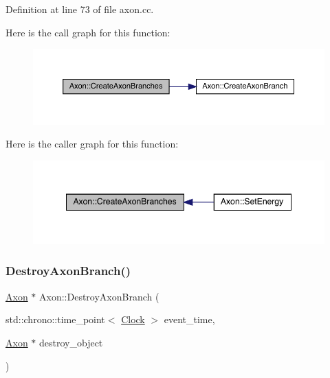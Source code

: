 Definition at line 73 of file axon.\+cc.

Here is the call graph for this function\+:
\nopagebreak
\begin{figure}[H]
\begin{center}
\leavevmode
\includegraphics[width=350pt]{class_axon_ab0da51c05a0879efdb45c594b68ef8fd_cgraph}
\end{center}
\end{figure}
Here is the caller graph for this function\+:
\nopagebreak
\begin{figure}[H]
\begin{center}
\leavevmode
\includegraphics[width=348pt]{class_axon_ab0da51c05a0879efdb45c594b68ef8fd_icgraph}
\end{center}
\end{figure}
\mbox{\label{class_axon_a6ac580e4565d24c955b0a48d7a8b20e2}} 
\subsubsection{\texorpdfstring{Destroy\+Axon\+Branch()}{DestroyAxonBranch()}}
{\footnotesize\ttfamily \hyperlink{class_axon}{Axon} $\ast$ Axon\+::\+Destroy\+Axon\+Branch (\begin{DoxyParamCaption}\item[{std\+::chrono\+::time\+\_\+point$<$ \hyperlink{universe_8h_a0ef8d951d1ca5ab3cfaf7ab4c7a6fd80}{Clock} $>$}]{event\+\_\+time,  }\item[{\hyperlink{class_axon}{Axon} $\ast$}]{destroy\+\_\+object }\end{DoxyParamCaption})}



